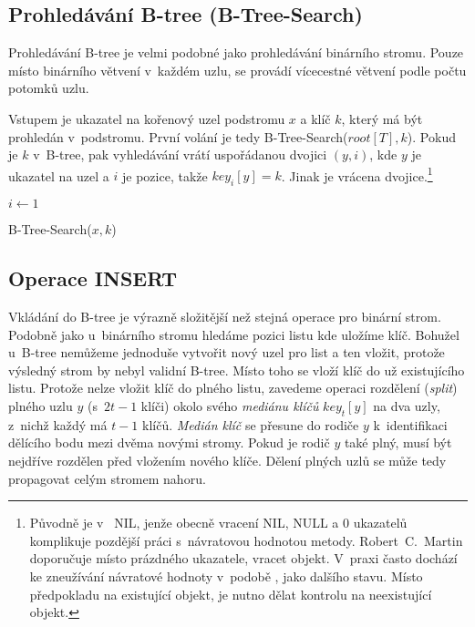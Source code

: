 \subsection{Prohledávání B-tree (B-Tree-Search)}

Prohledávání B-tree je velmi podobné jako prohledávání binárního stromu\@.
Pouze místo binárního větvení v~každém uzlu, se provádí vícecestné
větvení podle počtu potomků uzlu\@.

Vstupem je ukazatel na kořenový uzel podstromu $x$ a klíč $k$, který má být prohledán v~podstromu\@. První volání je tedy B-Tree-Search($root[T],k$).
Pokud je $k$ v~B-tree, pak vyhledávání vrátí uspořádanou dvojici $(y,i)$, kde $y$ je ukazatel na uzel a $i$ je pozice, takže $key_{i}[y]=k$.
Jinak je vrácena  dvojice.\footnote{Původně je v~\cite{Cormen:2001:IA:580470} NIL, jenže obecně vracení
NIL, NULL a 0 ukazatelů komplikuje pozdější práci s~návratovou hodnotou metody.
Robert~C.~Martin doporučuje místo prázdného ukazatele, vracet  objekt\cite{martin2009clean}.
V~praxi často dochází ke zneužívání návratové hodnoty v~podobě , jako dalšího stavu.
Místo předpokladu na existující objekt, je nutno dělat kontrolu na neexistující objekt.}

\begin{algorithm}[t]
\SetAlgoLined
{}

$i \longleftarrow 1$\\

\caption[B-Tree-Search($x,k$)]{B-Tree-Search($x,k$)\cite{Cormen:2001:IA:580470}}
\end{algorithm}



\subsection{Operace INSERT}

Vkládání do B-tree je výrazně složitější než stejná operace pro binární strom.
Podobně jako u~binárního stromu hledáme pozici listu kde uložíme klíč.
Bohužel u~B-tree nemůžeme jednoduše vytvořit nový uzel pro list a ten vložit, protože výsledný strom by nebyl validní B-tree.
Místo toho se vloží klíč do už existujícího listu.
Protože nelze vložit klíč do plného listu, zavedeme operaci rozdělení (\emph{split}) plného uzlu $y$ (s~$2t-1$ klíči) okolo svého \emph{mediánu klíčů} $key_{t}[y]$ na dva uzly, z~nichž každý má $t-1$ klíčů.
\emph{Medián klíč} se přesune do rodiče $y$ k~identifikaci dělícího bodu mezi dvěma novými stromy.
Pokud je rodič $y$ také plný, musí být nejdříve rozdělen před vložením nového klíče.
Dělení plných uzlů se může tedy propagovat celým stromem nahoru.

